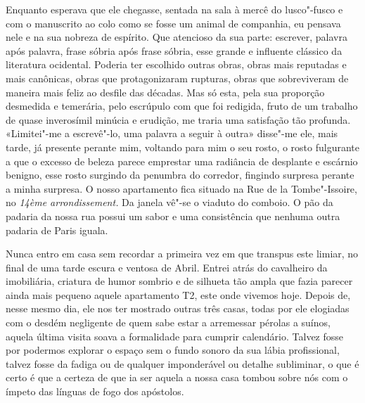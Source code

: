 Enquanto esperava que ele chegasse, sentada na sala à
mercê do lusco"-fusco e com o manuscrito ao colo como se fosse um animal
de companhia, eu pensava nele e na sua nobreza de espírito. Que
atencioso da sua parte: escrever, palavra após palavra, frase sóbria
após frase sóbria, esse grande e influente clássico da literatura
ocidental. Poderia ter escolhido outras obras, obras mais reputadas e
mais canônicas, obras que protagonizaram rupturas, obras que
sobreviveram de maneira mais feliz ao desfile das décadas. Mas só
esta, pela sua proporção desmedida e temerária, pelo escrúpulo com que
foi redigida, fruto de um trabalho de quase inverosímil minúcia e
erudição, me traria uma satisfação tão profunda. «Limitei"-me a
escrevê"-lo, uma palavra a seguir à outra» disse"-me ele, mais tarde, já
presente perante mim, voltando para mim o seu rosto, o rosto
fulgurante a que o excesso de beleza parece emprestar uma radiância de
desplante e escárnio benigno, esse rosto surgindo da penumbra do
corredor, fingindo surpresa perante a minha surpresa. O nosso
apartamento fica situado na Rue de la Tombe"-Issoire, no \emph{14ème
arrondissement. }Da janela vê"-se o viaduto do comboio. O pão da padaria
da nossa rua possui um sabor e uma consistência que nenhuma outra
padaria de Paris iguala.

Nunca entro em casa sem recordar a primeira vez em que transpus este
limiar, no final de uma tarde escura e ventosa de Abril. Entrei atrás do
cavalheiro da imobiliária, criatura de humor sombrio e de silhueta tão
ampla que fazia parecer ainda mais pequeno aquele apartamento T2, este
onde vivemos hoje. Depois de, nesse mesmo dia, ele nos ter mostrado
outras três casas, todas por ele elogiadas com o desdém negligente de
quem sabe estar a arremessar pérolas a suínos, aquela última visita
soava a formalidade para cumprir calendário. Talvez fosse por podermos
explorar o espaço sem o fundo
sonoro da sua lábia profissional, talvez fosse da fadiga ou de qualquer
imponderável ou detalhe subliminar, o que é certo é que a certeza de que
ia ser aquela a nossa casa tombou sobre nós com o ímpeto das línguas de
fogo dos apóstolos.

